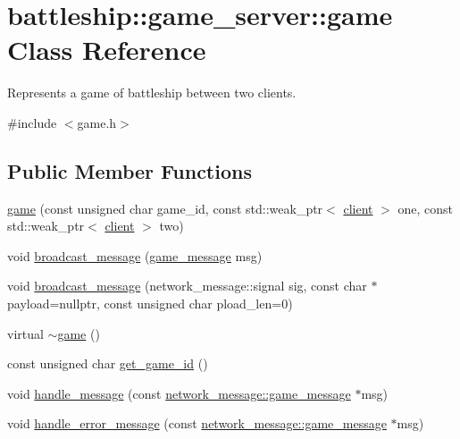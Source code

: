 \hypertarget{classbattleship_1_1game__server_1_1game}{}\section{battleship\+:\+:game\+\_\+server\+:\+:game Class Reference}
\label{classbattleship_1_1game__server_1_1game}


Represents a game of battleship between two clients.  




{\ttfamily \#include $<$game.\+h$>$}

\subsection*{Public Member Functions}
\begin{DoxyCompactItemize}
\item 
\hyperlink{classbattleship_1_1game__server_1_1game_a17582f2a51f16538e3bc2a821676e153}{game} (const unsigned char game\+\_\+id, const std\+::weak\+\_\+ptr$<$ \hyperlink{classbattleship_1_1game__server_1_1client}{client} $>$ one, const std\+::weak\+\_\+ptr$<$ \hyperlink{classbattleship_1_1game__server_1_1client}{client} $>$ two)
\item 
void \hyperlink{classbattleship_1_1game__server_1_1game_aa1a53bc008c83a9f21f60565a49fc56e}{broadcast\+\_\+message} (\hyperlink{classbattleship_1_1network__message_1_1game__message}{game\+\_\+message} msg)
\item 
void \hyperlink{classbattleship_1_1game__server_1_1game_abff5647f203e7690ac2ac1cd1c1b21a5}{broadcast\+\_\+message} (network\+\_\+message\+::signal sig, const char $\ast$payload=nullptr, const unsigned char pload\+\_\+len=0)
\item 
virtual \hyperlink{classbattleship_1_1game__server_1_1game_a49674bd20bc7bf09660a2aaa0287c5e6}{$\sim$game} ()
\item 
const unsigned char \hyperlink{classbattleship_1_1game__server_1_1game_ace88cc824634bc6b4ba27bdc5084ca91}{get\+\_\+game\+\_\+id} ()
\item 
void \hyperlink{classbattleship_1_1game__server_1_1game_ace7a4f5c9bbd5968869ff37763a3b7eb}{handle\+\_\+message} (const \hyperlink{classbattleship_1_1network__message_1_1game__message}{network\+\_\+message\+::game\+\_\+message} $\ast$msg)
\item 
void \hyperlink{classbattleship_1_1game__server_1_1game_a986ce2178cc21dd78bd74de2f234e9d5}{handle\+\_\+error\+\_\+message} (const \hyperlink{classbattleship_1_1network__message_1_1game__message}{network\+\_\+message\+::game\+\_\+message} $\ast$msg)
\end{DoxyCompactItemize}


